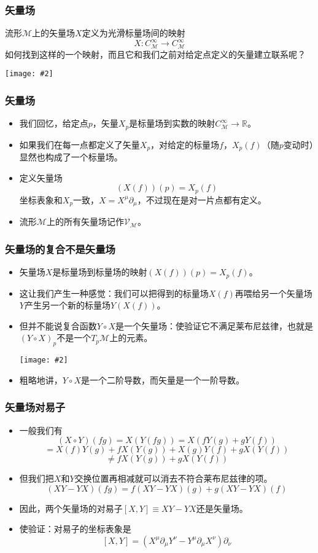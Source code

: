 \documentclass[CJK]{beamer}
\newcommand{\reals}{\mathbb{R}}
\newcommand{\mani}{\mathcal{M}}
\newcommand{\cpic}[2]{
\begin{center}
\texttt{[image: \#2]}
\end{center}
}
\begin{document}
\begin{frame}
\frametitle{\bch 矢量场 \ech}
\bch
流形$\mani$上的矢量场$X$定义为光滑标量场间的映射
$$
X: C^\infty_\mani \to C^\infty_\mani
$$
如何找到这样的一个映射，而且它和我们之前对给定点定义的矢量建立联系呢？
\cpic{0.15}{speechless}
\ech
\end{frame}

\begin{frame}
\frametitle{\bch 矢量场 \ech}
\bch
\begin{itemize}
\item
我们回忆，给定点$p$，矢量$X_p$是标量场到实数的映射$C^\infty_\mani \to \reals$。
\item
如果我们在每一点都定义了矢量$X_p$，对给定的标量场$f$，$X_p(f)$（随$p$变动时）显然也构成了一个标量场。
\item
定义矢量场{\color{blue}$$(X(f))(p) = X_p(f)$$}坐标表象和$X_p$一致，$X = X^\mu \partial_\mu$，不过现在是对一片点都有定义。
\item 流形$\mani$上的所有矢量场记作$\mathcal{V}_\mani$。
\end{itemize}
\ech
\end{frame}

\begin{frame}
\frametitle{\bch 矢量场的复合不是矢量场 \ech}
\bch
\begin{itemize}
\item
矢量场$X$是标量场到标量场的映射$(X(f))(p) = X_p(f)$。
\item
这让我们产生一种感觉：我们可以把得到的标量场$X(f)$再喂给另一个矢量场$Y$产生另一个新的标量场$Y(X(f))$。
\item
但并不能说复合函数$Y \circ X$是一个矢量场：使验证它不满足莱布尼兹律，也就是$(Y\circ X)_p$不是一个$T_p\mani$上的元素。
\cpic{0.15}{sad}
\item 粗略地讲，$Y\circ X$是一个二阶导数，而矢量是一个一阶导数。
\end{itemize}
\ech
\end{frame}

\begin{frame}
\frametitle{\bch 矢量场对易子 \ech}
\bch
\begin{itemize}
\item 一般我们有
$$(X\circ Y)(fg) = X(Y(fg)) = X(f Y(g) + gY(f)) $$ $$= X(f) Y(g) + f X(Y(g)) + X(g) Y(f) + g X(Y(f)) $$ $$\not= fX(Y(g)) + g X(Y(f))
$$
\item
但我们把$X$和$Y$交换位置再相减就可以消去不符合莱布尼兹律的项。
$$(XY-YX)(fg) = f(XY-YX)(g) + g(XY-YX)(f)$$
\item
因此，两个矢量场的对易子$[X,Y] \equiv XY-YX$还是矢量场。
\item
使验证：对易子的坐标表象是$$[X,Y] = \left( X^\mu \partial_\mu Y^\nu - Y^\mu \partial_\mu X^\nu\right) \partial_\nu$$
\end{itemize}
\ech
\end{frame}
\end{document}

